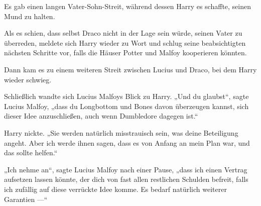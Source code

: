 Es gab einen langen Vater-Sohn-Streit, während dessen Harry es schaffte, seinen Mund zu halten.

Als es schien, dass selbst Draco nicht in der Lage sein würde, seinen Vater zu überreden, meldete sich Harry wieder zu Wort und schlug seine beabsichtigten nächsten Schritte vor, falls die Häuser Potter und Malfoy kooperieren könnten.

Dann kam es zu einem weiteren Streit zwischen Lucius und Draco, bei dem Harry wieder schwieg.

Schließlich wandte sich Lucius Malfoys Blick zu Harry.
„Und du glaubst“, sagte Lucius Malfoy, „dass du Longbottom und Bones davon überzeugen kannst, sich dieser Idee anzuschließen, auch wenn Dumbledore dagegen ist.“

Harry nickte.
„Sie werden natürlich misstrauisch sein, was deine Beteiligung angeht. Aber ich werde ihnen sagen, dass es von Anfang an mein Plan war, und das sollte helfen.“

„Ich nehme an“, sagte Lucius Malfoy nach einer Pause, „dass ich einen Vertrag aufsetzen lassen könnte, der dich von fast allen restlichen Schulden befreit, falls ich zufällig auf diese verrückte Idee komme. Es bedarf natürlich weiterer Garantien —“

